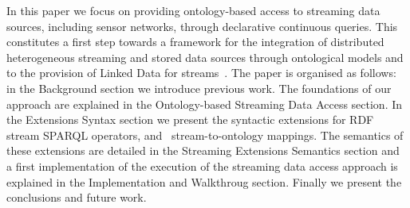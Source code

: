 In this paper we focus on providing ontology-based access to streaming data sources, including sensor networks, through
declarative continuous queries. This constitutes a first step towards a framework for the integration of distributed
heterogeneous streaming and stored data sources through ontological models and to the provision of Linked Data for
streams~\cite{LePhuoc_09,Page_09,Sequeda_09}. The paper is organised as follows: in the Background section %
we introduce previous work. The foundations of our approach are explained in the Ontology-based Streaming Data Access section. %
In the Extensions Syntax section
we present the syntactic extensions for RDF stream SPARQL operators, and \rtwoo\ stream-to-ontology
mappings. The semantics of these extensions are detailed in the Streaming Extensions Semantics section %
and a first implementation of the execution of the streaming data access approach is explained in the Implementation and Walkthroug section. %
Finally we present the conclusions and future work.
